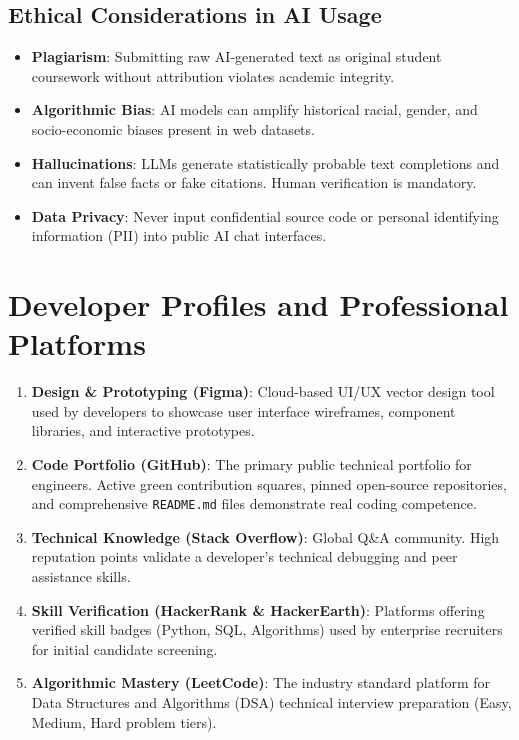 \subsection{Ethical Considerations in AI Usage}
\begin{itemize}[leftmargin=1.5em]
    \item \textbf{Plagiarism}: Submitting raw AI-generated text as original student coursework without attribution violates academic integrity.
    \item \textbf{Algorithmic Bias}: AI models can amplify historical racial, gender, and socio-economic biases present in web datasets.
    \item \textbf{Hallucinations}: LLMs generate statistically probable text completions and can invent false facts or fake citations. Human verification is mandatory.
    \item \textbf{Data Privacy}: Never input confidential source code or personal identifying information (PII) into public AI chat interfaces.
\end{itemize}

\section{Developer Profiles and Professional Platforms}

\begin{enumerate}[leftmargin=1.5em]
    \item \textbf{Design \& Prototyping (Figma)}: Cloud-based UI/UX vector design tool used by developers to showcase user interface wireframes, component libraries, and interactive prototypes.
    \item \textbf{Code Portfolio (GitHub)}: The primary public technical portfolio for engineers. Active green contribution squares, pinned open-source repositories, and comprehensive \texttt{README.md} files demonstrate real coding competence.
    \item \textbf{Technical Knowledge (Stack Overflow)}: Global Q\&A community. High reputation points validate a developer's technical debugging and peer assistance skills.
    \item \textbf{Skill Verification (HackerRank \& HackerEarth)}: Platforms offering verified skill badges (Python, SQL, Algorithms) used by enterprise recruiters for initial candidate screening.
    \item \textbf{Algorithmic Mastery (LeetCode)}: The industry standard platform for Data Structures and Algorithms (DSA) technical interview preparation (Easy, Medium, Hard problem tiers).
\end{enumerate}

